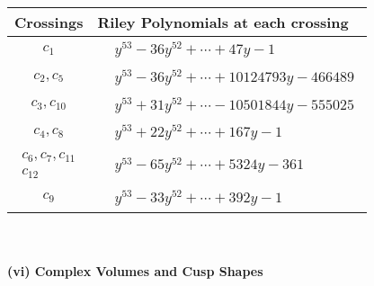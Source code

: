 \documentclass[1p]{elsarticle_modified}
\theoremstyle{definition}
\begin{document}
\begin{tabular}{m{50pt}|m{274pt}}
Crossings & \hspace{64pt}Riley Polynomials at each crossing \\
\hline $$\begin{aligned}c_{1}\end{aligned}$$&$\begin{aligned}
&y^{53}-36 y^{52}+\cdots+47 y-1
\end{aligned}$\\
\hline $$\begin{aligned}c_{2},c_{5}\end{aligned}$$&$\begin{aligned}
&y^{53}-36 y^{52}+\cdots+10124793 y-466489
\end{aligned}$\\
\hline $$\begin{aligned}c_{3},c_{10}\end{aligned}$$&$\begin{aligned}
&y^{53}+31 y^{52}+\cdots-10501844 y-555025
\end{aligned}$\\
\hline $$\begin{aligned}c_{4},c_{8}\end{aligned}$$&$\begin{aligned}
&y^{53}+22 y^{52}+\cdots+167 y-1
\end{aligned}$\\
\hline $$\begin{aligned}c_{6},c_{7},c_{11}\\c_{12}\end{aligned}$$&$\begin{aligned}
&y^{53}-65 y^{52}+\cdots+5324 y-361
\end{aligned}$\\
\hline $$\begin{aligned}c_{9}\end{aligned}$$&$\begin{aligned}
&y^{53}-33 y^{52}+\cdots+392 y-1
\end{aligned}$\\
\hline
\end{tabular}\\~\\
\newpage\flushleft \textbf{(vi) Complex Volumes and Cusp Shapes}
\end{document}
